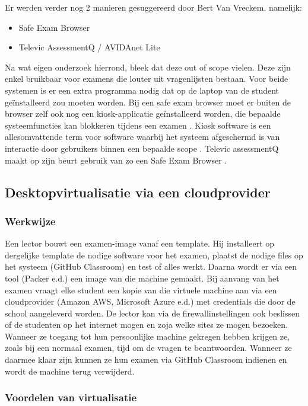 Er werden verder nog 2 manieren gesuggereerd door Bert Van Vreckem. namelijk:  
\begin{itemize}
	\item Safe Exam Browser 
	\item Televic AssessmentQ / AVIDAnet Lite
\end{itemize}

Na wat eigen onderzoek hierrond, bleek dat deze out of scope vielen. Deze zijn enkel bruikbaar voor examens die louter uit vragenlijsten bestaan. Voor beide systemen is er een extra programma nodig dat op de laptop van de student ge\"{i}nstalleerd zou moeten worden. Bij een safe exam browser moet er buiten de browser zelf ook nog een kiosk-applicatie ge\"{i}nstalleerd worden, die bepaalde systeemfuncties kan blokkeren tijdens een examen \autocite{SEB2019}. Kiosk software is een allesomvattende term voor software waarbij het systeem afgeschermd is van interactie door gebruikers binnen een bepaalde scope \autocite{Kio2009}. Televic assessmentQ maakt op zijn beurt gebruik van zo een Safe Exam Browser \autocite{Tele2019}. 

\subsection{Desktopvirtualisatie via een cloudprovider}

\subsubsection{Werkwijze}
Een lector bouwt een examen-image vanaf een template. Hij installeert op dergelijke template de nodige software voor het examen, plaatst de nodige files op het systeem (GitHub Classroom) en test of alles werkt.  Daarna wordt er via een tool (Packer e.d.) een image van die machine gemaakt.  Bij aanvang van het examen vraagt elke student een kopie van die virtuele machine aan via een cloudprovider (Amazon AWS, Microsoft Azure e.d.) met credentials die door de school aangeleverd worden. De lector kan via de firewallinstellingen ook beslissen of de studenten op het internet mogen en zoja welke sites ze mogen bezoeken. Wanneer ze toegang tot hun persoonlijke machine gekregen hebben krijgen ze, zoals bij een normaal examen, tijd om de vragen te beantwoorden. Wanneer ze daarmee klaar zijn kunnen ze hun examen via GitHub Classroom indienen en wordt de machine terug verwijderd. 

\subsubsection{Voordelen van virtualisatie}

